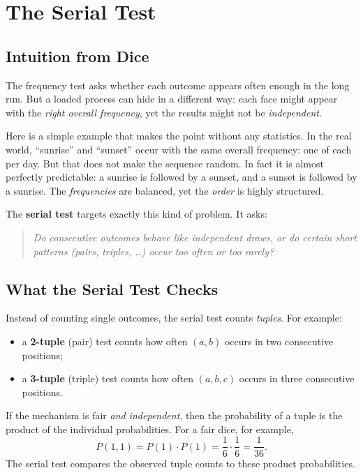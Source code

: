 \chapter{The Serial Test}

\section{Intuition from Dice}
The frequency test asks whether each outcome appears often enough in the long
run.  But a loaded process can hide in a different way: each face might appear
with the \emph{right overall frequency}, yet the results might not be
\emph{independent}.

Here is a simple example that makes the point without any statistics.  In the
real world, ``sunrise'' and ``sunset'' occur with the same overall frequency:
one of each per day.  But that does not make the sequence random.  In fact it
is almost perfectly predictable: a sunrise is followed by a sunset, and a
sunset is followed by a sunrise.  The \emph{frequencies} are balanced, yet the
\emph{order} is highly structured.

The \textbf{serial test} targets exactly this kind of problem.  It asks:
\begin{quote}
  \emph{Do consecutive outcomes behave like independent draws, or do certain
  short patterns (pairs, triples, \dots) occur too often or too rarely?}
\end{quote}

\section{What the Serial Test Checks}
Instead of counting single outcomes, the serial test counts \emph{tuples}.
For example:
\begin{itemize}
  \item a \textbf{2-tuple} (pair) test counts how often \((a,b)\) occurs in two
        consecutive positions;
  \item a \textbf{3-tuple} (triple) test counts how often \((a,b,c)\) occurs in
        three consecutive positions.
\end{itemize}

If the mechanism is fair \emph{and independent}, then the probability of a tuple
is the product of the individual probabilities.  For a fair dice, for example,
\[
  P(1,1) = P(1)\cdot P(1) = \frac{1}{6}\cdot\frac{1}{6} = \frac{1}{36}.
\]
The serial test compares the observed tuple counts to these product
probabilities.

